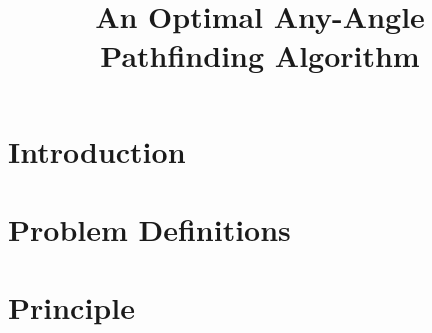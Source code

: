 \documentclass{article}
\begin{document}
\title{An Optimal Any-Angle Pathfinding Algorithm}
\maketitle

\section{Introduction}


\section{Problem Definitions}


\section{Principle}

\end{document}
